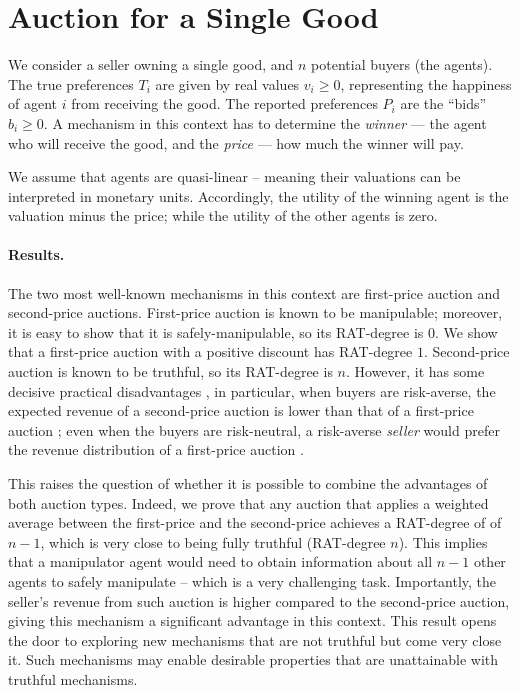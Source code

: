 \section{Auction for a Single Good}
\label{sec:single-item-auction}

We consider a seller owning a single good, and $n$ potential buyers (the agents). 
The true preferences $T_i$ are given by real values $v_i \geq 0$, representing the happiness of agent $i$ from receiving the good. 
The reported preferences $P_i$ are the ``bids'' $b_i \geq 0 $.
A mechanism in this context has to determine the \emph{winner} --- the agent who will receive the good, and the \emph{price} --- how much the winner will pay.

We assume that agents are quasi-linear -- meaning their valuations can be interpreted in monetary units. 
Accordingly, the utility of the winning agent is the valuation minus the price; while the utility of the other agents is zero. 

\paragraph{Results.} The two most well-known mechanisms in this context are first-price auction and second-price auctions. 
%
First-price auction is known to be manipulable; moreover, it is easy to show that it is safely-manipulable, so its RAT-degree is $0$.
We show that a first-price auction with a positive discount has RAT-degree $1$.
%
Second-price auction is known to be truthful, so its  RAT-degree is $n$.
However, it has some decisive practical disadvantages \cite{ausubel2006lovely}, in particular, when buyers are risk-averse, the expected revenue of a second-price auction is lower than that of a first-price auction \cite{nisan2007algorithmic};
even when the buyers are risk-neutral, a risk-averse \emph{seller} would prefer the revenue distribution of a first-price auction \citep{krishna2009auction}.%

This raises the question of whether it is possible to combine the advantages of both auction types.
Indeed, we prove that 
any auction that applies a weighted average between the first-price and the second-price achieves a RAT-degree of of $n-1$, which is very close to being fully truthful (RAT-degree $n$). 
This implies that a manipulator agent would need to obtain information about all $n-1$ other agents to safely manipulate -- which is a very challenging task.
Importantly, the seller’s revenue from such auction is higher compared to the second-price auction, giving this mechanism a significant advantage in this context. 
This result opens the door to exploring new mechanisms that are not truthful but come very close it. 
Such mechanisms may enable desirable properties that  are unattainable with truthful mechanisms.


